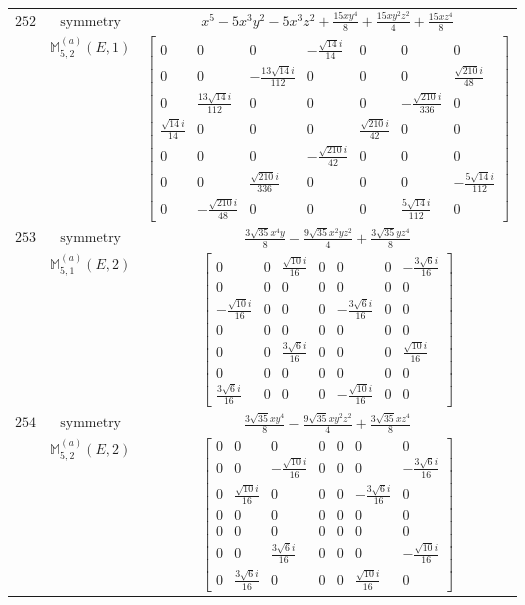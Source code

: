 \documentclass[fleqn,8pt,landscape]{jsarticle}
\begin{document}
\begin{longtable}{ccc}
$ 252 $ & $ \text{symmetry} $ & $ x^{5} - 5 x^{3} y^{2} - 5 x^{3} z^{2} + \frac{15 x y^{4}}{8} + \frac{15 x y^{2} z^{2}}{4} + \frac{15 x z^{4}}{8} $ \\
$  $ & $ \mathbb{M}_{5,2}^{(a)}(E,1) $ & $ \begin{bmatrix} 0 & 0 & 0 & - \frac{\sqrt{14} i}{14} & 0 & 0 & 0 \\ 0 & 0 & - \frac{13 \sqrt{14} i}{112} & 0 & 0 & 0 & \frac{\sqrt{210} i}{48} \\ 0 & \frac{13 \sqrt{14} i}{112} & 0 & 0 & 0 & - \frac{\sqrt{210} i}{336} & 0 \\ \frac{\sqrt{14} i}{14} & 0 & 0 & 0 & \frac{\sqrt{210} i}{42} & 0 & 0 \\ 0 & 0 & 0 & - \frac{\sqrt{210} i}{42} & 0 & 0 & 0 \\ 0 & 0 & \frac{\sqrt{210} i}{336} & 0 & 0 & 0 & - \frac{5 \sqrt{14} i}{112} \\ 0 & - \frac{\sqrt{210} i}{48} & 0 & 0 & 0 & \frac{5 \sqrt{14} i}{112} & 0 \end{bmatrix} $ \\ \hline
$ 253 $ & $ \text{symmetry} $ & $ \frac{3 \sqrt{35} x^{4} y}{8} - \frac{9 \sqrt{35} x^{2} y z^{2}}{4} + \frac{3 \sqrt{35} y z^{4}}{8} $ \\
$  $ & $ \mathbb{M}_{5,1}^{(a)}(E,2) $ & $ \begin{bmatrix} 0 & 0 & \frac{\sqrt{10} i}{16} & 0 & 0 & 0 & - \frac{3 \sqrt{6} i}{16} \\ 0 & 0 & 0 & 0 & 0 & 0 & 0 \\ - \frac{\sqrt{10} i}{16} & 0 & 0 & 0 & - \frac{3 \sqrt{6} i}{16} & 0 & 0 \\ 0 & 0 & 0 & 0 & 0 & 0 & 0 \\ 0 & 0 & \frac{3 \sqrt{6} i}{16} & 0 & 0 & 0 & \frac{\sqrt{10} i}{16} \\ 0 & 0 & 0 & 0 & 0 & 0 & 0 \\ \frac{3 \sqrt{6} i}{16} & 0 & 0 & 0 & - \frac{\sqrt{10} i}{16} & 0 & 0 \end{bmatrix} $ \\ \hline
$ 254 $ & $ \text{symmetry} $ & $ \frac{3 \sqrt{35} x y^{4}}{8} - \frac{9 \sqrt{35} x y^{2} z^{2}}{4} + \frac{3 \sqrt{35} x z^{4}}{8} $ \\
$  $ & $ \mathbb{M}_{5,2}^{(a)}(E,2) $ & $ \begin{bmatrix} 0 & 0 & 0 & 0 & 0 & 0 & 0 \\ 0 & 0 & - \frac{\sqrt{10} i}{16} & 0 & 0 & 0 & - \frac{3 \sqrt{6} i}{16} \\ 0 & \frac{\sqrt{10} i}{16} & 0 & 0 & 0 & - \frac{3 \sqrt{6} i}{16} & 0 \\ 0 & 0 & 0 & 0 & 0 & 0 & 0 \\ 0 & 0 & 0 & 0 & 0 & 0 & 0 \\ 0 & 0 & \frac{3 \sqrt{6} i}{16} & 0 & 0 & 0 & - \frac{\sqrt{10} i}{16} \\ 0 & \frac{3 \sqrt{6} i}{16} & 0 & 0 & 0 & \frac{\sqrt{10} i}{16} & 0 \end{bmatrix} $ \\ \hline

\end{longtable}
\end{document}
